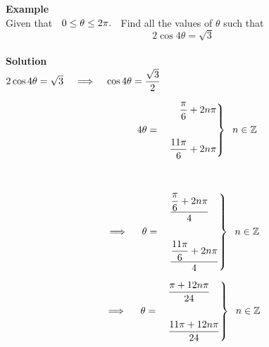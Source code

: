 \documentclass[11pt,a4paper]{article}
\begin{document}
\textbf{Example}\\
Given that $\hspace{0.2cm} 0 \leq \theta \leq 2\pi.\hspace{0.2cm}$ Find all the values of $\theta$ such that $$2\cos 4\theta = \sqrt{3}$$\\



\textbf{Solution}\\

$2\cos 4\theta = \sqrt{3}\hspace{0.3cm} \implies \hspace{0.3cm} \cos 4\theta = \dfrac{\sqrt{3}}{2}$



\begin{align*}
4\theta & = \hspace{0.3cm}\left.\begin{aligned}
\dfrac{\pi}{6} & + 2n\pi\\\\
\dfrac{11\pi}{6}& + 2n\pi\\
\end{aligned}
\right\}\hspace{0.2cm} n \in \mathbb{Z}\\\\\\
\implies \hspace{0.4cm} \theta & = \hspace{0.3cm}\left.\begin{aligned}
& \dfrac{\dfrac{\pi}{6} + 2n\pi}{4}\\\\
& \dfrac{\dfrac{11\pi}{6} + 2n\pi}{4}\\
\end{aligned}
\right\}\hspace{0.2cm} n \in \mathbb{Z}
\end{align*}



\[\implies \hspace{0.4cm} \theta = \hspace{0.3cm}\left.\begin{aligned}
& \dfrac{\pi + 12n\pi}{24}\\\\
& \dfrac{11\pi + 12n\pi}{24}\\
\end{aligned}
\right\}\hspace{0.2cm} n \in \mathbb{Z}
\]\\\\
\end{document}
